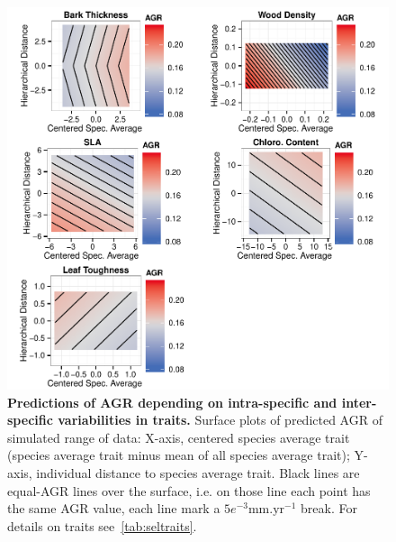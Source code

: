 \begin{figure}[!ptb]
	\centering
	\includegraphics{figures/Sel_Traits_Simul_AGR_2015-05-30.pdf}
	\caption{\textbf{Predictions of AGR depending on intra-specific and inter-specific variabilities in traits.} Surface plots of predicted AGR of simulated range of data: X-axis, centered species average trait (species average trait minus mean of all species average trait); Y-axis, individual distance to species average trait. Black lines are equal-AGR lines over the surface, i.e. on those line each point has the same AGR value, each line mark a $5e^{-3}\text{mm}.\text{yr}^{-1}$ break. For details on traits see~\autoref{tab:seltraits}.}
	\label{fig:simul}
\end{figure}